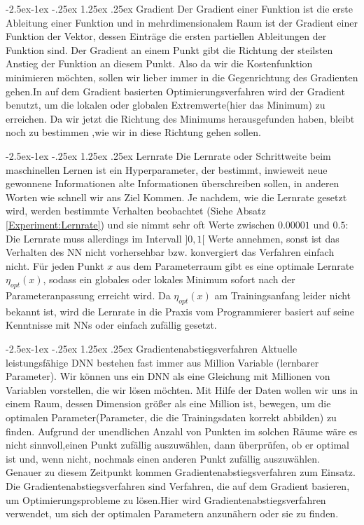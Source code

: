 \documentclass[12pt,a4paper]{scrartcl}
\makeatletter
\numberwithin{equation}{section}
\renewcommand\paragraph{\@startsection{paragraph}{4}{\z@}%
	{-2.5ex\@plus -1ex \@minus -.25ex}%
	{1.25ex \@plus .25ex}%
	{\normalfont\normalsize\bfseries}}
\makeatother
\begin{document}
\paragraph{ Gradient}\label{Gradient}
Der Gradient einer Funktion ist die erste Ableitung einer Funktion und in mehrdimensionalem Raum ist der Gradient einer Funktion der Vektor, dessen Einträge  die ersten partiellen Ableitungen der Funktion sind. Der Gradient an einem Punkt gibt die Richtung der steilsten Anstieg der Funktion an diesem Punkt.  Also da wir die Kostenfunktion minimieren möchten, sollen wir lieber immer in die Gegenrichtung des Gradienten gehen.In auf dem Gradient basierten Optimierungsverfahren wird der Gradient benutzt, um die lokalen oder globalen Extremwerte(hier das Minimum) zu erreichen.
Da wir jetzt die Richtung des Minimums herausgefunden haben, bleibt noch zu bestimmen ,wie wir in diese Richtung gehen  sollen.

\paragraph{Lernrate}\label{Lernrate}
Die Lernrate oder Schrittweite beim maschinellen Lernen ist ein Hyperparameter, der bestimmt, inwieweit neue gewonnene Informationen alte Informationen überschreiben sollen\cite{LearningRate}, in anderen Worten wie schnell wir ans Ziel Kommen.
Je nachdem, wie die Lernrate gesetzt wird, werden bestimmte Verhalten beobachtet (Siehe Absatz \ref{Experiment:Lernrate}) und sie nimmt sehr oft Werte zwischen $ 0.00001 $ und $ 0.5 $:
Die Lernrate muss allerdings im Intervall  $]0,1[$ Werte annehmen, sonst ist das Verhalten des \ac{NN} nicht vorhersehbar bzw. konvergiert das Verfahren einfach nicht.
Für jeden Punkt $ x $ aus dem Parameterraum gibt es eine optimale Lernrate $ \eta_{opt}(x) $, sodass ein globales oder lokales Minimum sofort nach der Parameteranpassung erreicht wird. Da $ \eta_{opt}(x) $ am Trainingsanfang leider nicht bekannt ist, wird die Lernrate in die Praxis vom Programmierer basiert auf seine Kenntnisse mit \acsp{NN} oder einfach zufällig gesetzt.

\paragraph{Gradientenabstiegsverfahren}\label{Gradientenabstiegsverfahren}
Aktuelle leistungsfähige \ac{DNN} bestehen fast immer aus Million Variable (lernbarer Parameter). Wir können uns ein \ac{DNN} als eine Gleichung mit Millionen von Variablen vorstellen, die wir lösen möchten. Mit Hilfe der Daten wollen wir uns in einem Raum, dessen Dimension größer als eine Million ist, bewegen, um die optimalen Parameter(Parameter, die die Trainingsdaten korrekt abbilden) zu finden. Aufgrund der unendlichen Anzahl von Punkten im solchen Räume wäre es nicht sinnvoll,einen Punkt zufällig auszuwählen, dann überprüfen, ob er optimal ist und, wenn nicht, nochmals einen anderen Punkt zufällig auszuwählen. Genauer zu diesem Zeitpunkt kommen Gradientenabstiegsverfahren zum Einsatz.
Die Gradientenabstiegsverfahren sind Verfahren, die auf dem Gradient basieren, um Optimierungsprobleme zu lösen.Hier wird Gradientenabstiegsverfahren verwendet, um sich der optimalen Parametern anzunähern oder sie zu finden.
\end{document}
